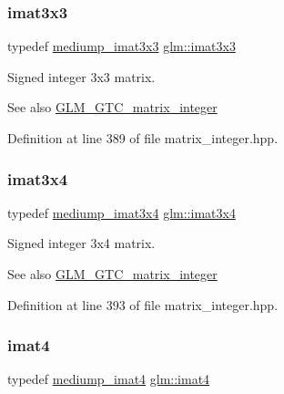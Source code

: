 \subsubsection{\texorpdfstring{imat3x3}{imat3x3}}
{\footnotesize\ttfamily typedef \mbox{\hyperlink{group__gtc__matrix__integer_gab4c647321a342c58119144ad08c6c406}{mediump\+\_\+imat3x3}} \mbox{\hyperlink{group__gtc__matrix__integer_gaeff9ef8f56cccc828d6b897923e75402}{glm\+::imat3x3}}}

Signed integer 3x3 matrix. \begin{DoxySeeAlso}{See also}
\mbox{\hyperlink{group__gtc__matrix__integer}{G\+L\+M\+\_\+\+G\+T\+C\+\_\+matrix\+\_\+integer}} 
\end{DoxySeeAlso}


Definition at line 389 of file matrix\+\_\+integer.\+hpp.

\mbox{\label{group__gtc__matrix__integer_gaee5507e6cbbdd05841a0c174e60dd036}} 
\subsubsection{\texorpdfstring{imat3x4}{imat3x4}}
{\footnotesize\ttfamily typedef \mbox{\hyperlink{group__gtc__matrix__integer_ga721a754fc35cc5ac097e331d893a6b2c}{mediump\+\_\+imat3x4}} \mbox{\hyperlink{group__gtc__matrix__integer_gaee5507e6cbbdd05841a0c174e60dd036}{glm\+::imat3x4}}}

Signed integer 3x4 matrix. \begin{DoxySeeAlso}{See also}
\mbox{\hyperlink{group__gtc__matrix__integer}{G\+L\+M\+\_\+\+G\+T\+C\+\_\+matrix\+\_\+integer}} 
\end{DoxySeeAlso}


Definition at line 393 of file matrix\+\_\+integer.\+hpp.

\mbox{\label{group__gtc__matrix__integer_ga40fc5c5e0b07543497aa1c314891544a}} 
\subsubsection{\texorpdfstring{imat4}{imat4}}
{\footnotesize\ttfamily typedef \mbox{\hyperlink{group__gtc__matrix__integer_ga680c97868de08658ca4924718d951def}{mediump\+\_\+imat4}} \mbox{\hyperlink{group__gtc__matrix__integer_ga40fc5c5e0b07543497aa1c314891544a}{glm\+::imat4}}}

